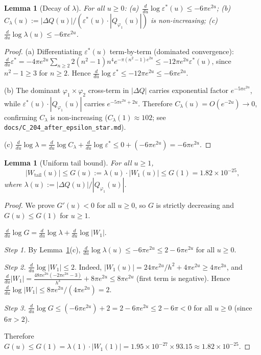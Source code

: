 \documentclass[11pt]{article}
\newtheorem{lemma}[theorem]{Lemma}
\theoremstyle{definition}
\theoremstyle{remark}
\begin{document}
\begin{lemma}[Decay of $\lambda$]\label{sublem:lambda_decay}
For all $u \geq 0$: \textup{(a)}~$\frac{d}{du}\log\varepsilon^*(u) \leq -6\pi e^{2u}$;\quad
\textup{(b)}~$C_\lambda(u) := |\Delta Q(u)|/(\varepsilon^*(u)\cdot|Q_{\varphi_1}(u)|)$ is non-increasing;\quad
\textup{(c)}~$\frac{d}{du}\log\lambda(u) \leq -6\pi e^{2u}$.
\end{lemma}
\begin{proof}
\textup{(a)} Differentiating $\varepsilon^*(u)$ term-by-term (dominated convergence):
$\frac{d}{du}\varepsilon^* = -4\pi e^{2u}\sum_{n\geq2}2(n^2-1)n^4 e^{-\pi(n^2-1)e^{2u}}
\leq -12\pi e^{2u}\varepsilon^*(u)$,
since $n^2-1\geq3$ for $n\geq2$.
Hence $\frac{d}{du}\log\varepsilon^*\leq -12\pi e^{2u}\leq -6\pi e^{2u}$.

\textup{(b)} The dominant $\varphi_1\times\varphi_2$ cross-term in $|\Delta Q|$ carries exponential
factor $e^{-5\pi e^{2u}}$, while $\varepsilon^*(u)\cdot|Q_{\varphi_1}(u)|$ carries
$e^{-5\pi e^{2u}+2u}$. Therefore $C_\lambda(u)=O(e^{-2u})\to0$, confirming $C_\lambda$ is
non-increasing ($C_\lambda(1)\approx102$; see \texttt{docs/C\_204\_after\_epsilon\_star.md}).

\textup{(c)} $\frac{d}{du}\log\lambda = \frac{d}{du}\log C_\lambda + \frac{d}{du}\log\varepsilon^*
\leq 0 + (-6\pi e^{2u}) = -6\pi e^{2u}$.
\end{proof}
\begin{lemma}[Uniform tail bound]\label{lem:wtail}
For all $u \geq 1$,
\[
|W_{\mathrm{tail}}(u)| \leq G(u) := \lambda(u)\cdot|W_1(u)| \leq G(1) = 1.82\times 10^{-25},
\]
where $\lambda(u) := |\Delta Q(u)|/|Q_{\varphi_1}(u)|$.
\end{lemma}
\begin{proof}
We prove $G'(u) < 0$ for all $u \geq 0$, so $G$ is strictly decreasing and $G(u)\leq G(1)$ for $u\geq 1$.

$\frac{d}{du}\log G = \frac{d}{du}\log\lambda + \frac{d}{du}\log|W_1|.$

\emph{Step 1.} By Lemma~\ref{sublem:lambda_decay}(c), $\frac{d}{du}\log\lambda(u) \leq -6\pi e^{2u} \leq 2-6\pi e^{2u}$ for all $u\geq0$.

\emph{Step 2.} $\frac{d}{du}\log|W_1| \leq 2$.
Indeed, $|W_1(u)| = 24\pi e^{2u}/h^2 + 4\pi e^{2u} \geq 4\pi e^{2u}$, and
$\frac{d}{du}|W_1| = \frac{48\pi e^{2u}(-2\pi e^{2u}-3)}{h^3} + 8\pi e^{2u} \leq 8\pi e^{2u}$
(first term is negative). Hence $\frac{d}{du}\log|W_1| \leq 8\pi e^{2u}/(4\pi e^{2u}) = 2$.

\emph{Step 3.} $\frac{d}{du}\log G \leq (-6\pi e^{2u}) + 2 = 2 - 6\pi e^{2u} \leq 2 - 6\pi < 0$
for all $u \geq 0$ (since $6\pi > 2$).

Therefore $G(u) \leq G(1) = \lambda(1)\cdot|W_1(1)| = 1.95\times 10^{-27}\times 93.15 \approx 1.82\times 10^{-25}$.
\end{proof}
\end{document}
